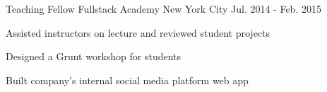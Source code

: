 \begin{cventries}
  \cventry
    {Teaching Fellow} %
    {Fullstack Academy} %
    {New York City} %
    {Jul. 2014 - Feb. 2015} %
    {
      \begin{cvitems} %
        \item {Assisted instructors on lecture and reviewed student projects}
        \item {Designed a Grunt workshop for students}
        \item {Built company's internal social media platform web app}
      \end{cvitems}
    }

\end{cventries}
